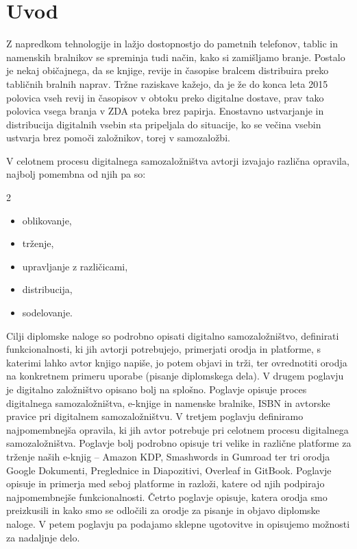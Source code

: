 \documentclass[a4paper, 12pt]{book}
\newcommand{\fixspacing}{\vspace{0pt plus 1filll}\mbox{}}
\begin{document}

\mainmatter
\setcounter{page}{1}
\pagestyle{fancy}

\chapter{Uvod}
Z napredkom tehnologije in lažjo dostopnostjo do pametnih telefonov, tablic in namenskih bralnikov se spreminja tudi način, kako si zamišljamo branje. Postalo je nekaj običajnega, da se knjige, revije in časopise bralcem distribuira preko tabličnih bralnih naprav. Tržne raziskave kažejo, da je že do konca leta 2015 polovica vseh revij in časopisov v obtoku preko digitalne dostave,\cite{2} prav tako polovica vsega branja v ZDA poteka brez papirja.\cite{3} Enostavno ustvarjanje in distribucija digitalnih vsebin sta pripeljala do situacije, ko se večina vsebin ustvarja brez pomoči založnikov, torej v samozaložbi.

V celotnem procesu digitalnega samozaložništva avtorji izvajajo različna opravila, najbolj pomembna od njih pa so:

\begin{multicols}{2}
	\begin{itemize}
		\item oblikovanje,
		\item trženje,
		\item upravljanje z različicami,
		\item distribucija,
		\item sodelovanje.
	\end{itemize}
	\fixspacing
\end{multicols}
Cilji diplomske naloge so podrobno opisati digitalno samozaložništvo, definirati funkcionalnosti, ki jih avtorji potrebujejo, primerjati orodja in platforme, s katerimi lahko avtor knjigo napiše, jo potem objavi in trži, ter ovrednotiti orodja na konkretnem primeru uporabe (pisanje diplomskega dela).
V drugem poglavju je digitalno založništvo opisano bolj na splošno. Poglavje opisuje proces digitalnega samozaložništva, e-knjige in namenske bralnike, ISBN in avtorske pravice pri digitalnem samozaložništvu. V tretjem poglavju definiramo najpomembnejša opravila, ki jih avtor potrebuje pri celotnem procesu digitalnega samozaložništva. Poglavje bolj podrobno opisuje tri velike in različne platforme za trženje naših e-knjig – Amazon KDP, Smashwords in Gumroad ter tri orodja Google Dokumenti, Preglednice in Diapozitivi, Overleaf in GitBook. Poglavje opisuje in primerja med seboj platforme in razloži, katere od njih podpirajo najpomembnejše funkcionalnosti. Četrto poglavje opisuje, katera orodja smo preizkusili in kako smo se odločili za  orodje za pisanje in objavo diplomske naloge. V petem poglavju pa podajamo sklepne ugotovitve in opisujemo možnosti za nadaljnje delo.
\end{document}
